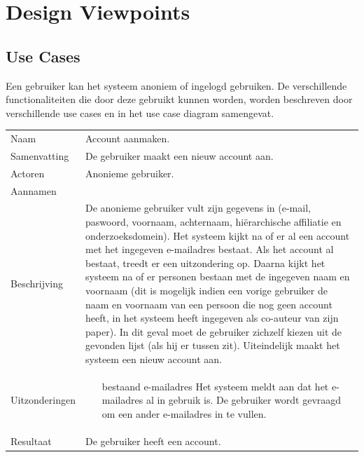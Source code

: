 \section{Design Viewpoints}

\subsection{Use Cases}
\label{use-cases}

Een gebruiker kan het systeem anoniem of ingelogd gebruiken. De verschillende functionaliteiten die door deze gebruikt kunnen worden, worden beschreven door verschillende use cases en in het use case diagram samengevat.

\begin{longtable}{lp{10cm}}
Naam           & Account aanmaken.\\
Samenvatting   & De gebruiker maakt een nieuw account aan.\\
Actoren        & Anonieme gebruiker.\\
Aannamen       & \\
Beschrijving   & De anonieme gebruiker vult zijn gegevens in (e-mail, paswoord, voornaam, achternaam, hiërarchische affiliatie en onderzoeksdomein).
Het systeem kijkt na of er al een account met het ingegeven e-mailadres bestaat. Als het account al bestaat, treedt er een uitzondering op.
Daarna kijkt het systeem na of er personen bestaan met de ingegeven naam en voornaam 
(dit is mogelijk indien een vorige gebruiker de naam en voornaam van een persoon die nog geen account heeft, in het systeem heeft ingegeven als co-auteur van zijn paper). 
In dit geval moet de gebruiker zichzelf kiezen uit de gevonden lijst (als hij er tussen zit).
Uiteindelijk maakt het systeem een nieuw account aan.\\
Uitzonderingen & 
\begin{itemize}
\item [bestaand e-mailadres] Het systeem meldt aan dat het e-mailadres al in gebruik is. De gebruiker wordt gevraagd om een ander e-mailadres in te vullen.
\end{itemize}\\
Resultaat      & De gebruiker heeft een account.\\
\end{longtable}

